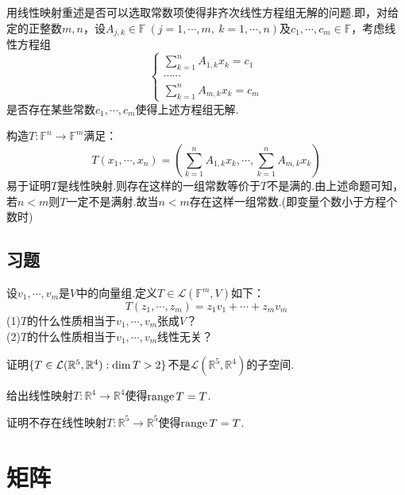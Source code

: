 \documentclass[lang=cn, zihao=5]{elegantbook}
\newcommand{\ssb}[1]{\left( #1 \right)}
\newcommand{\R}{\mathbb{R}}
\newcommand{\F}{\mathbb{F}}
\newcommand{\lmap}{\mathcal{L}}
\DeclareMathOperator{\rge}{range}
\begin{document}
\begin{example}
	用线性映射重述是否可以选取常数项使得非齐次线性方程组无解的问题.即，对给定的正整数$m,n$，设$A_{j,k} \in \F ~(j=1,\cdots ,m,~k=1,\cdots ,n)$及$c_1, \cdots ,c_m \in \F$，考虑线性方程组$$\begin{cases}
		\sum_{k=1}^{n} A_{1,k}x_k = c_1 \\
		\cdots \cdots \\
		\sum_{k=1}^{n} A_{m,k}x_k = c_m
	\end{cases}$$
	是否存在某些常数$c_1, \cdots ,c_m$使得上述方程组无解.
\end{example}
\begin{solution}
	构造$T:\F ^n \to \F ^m$满足：$$T(x_1, \cdots ,x_n) = \ssb{\sum_{k=1}^{n} A_{1,k}x_k, \cdots , \sum_{k=1}^{n} A_{m,k}x_k}$$
	易于证明$T$是线性映射.则存在这样的一组常数等价于$T$不是满的.由上述命题可知，若$n<m$则$T$一定不是满射.故当$n < m$存在这样一组常数.(即变量个数小于方程个数时)
\end{solution}

\subsection*{习题}

\begin{exercise}
	设$v_1,\cdots ,v_m$是$V$中的向量组.定义$T \in \lmap (\F ^m,V)$如下：$$T(z_1, \cdots ,z_m) = z_1v_1 + \cdots + z_mv_m$$
	(1)$T$的什么性质相当于$v_1, \cdots ,v_m$张成$V$？ \\
	(2)$T$的什么性质相当于$v_1, \cdots ,v_m$线性无关？
\end{exercise}

\begin{exercise}
	证明$\{ T \in \lmap (\R ^5,\R ^4):\dim \null T>2 \}$不是$\lmap (\R ^5,\R ^4)$的子空间.
\end{exercise}

\begin{exercise}
	给出线性映射$T : \R ^4 \to \R ^4$使得$\rge T = \null T$.
\end{exercise}

\begin{exercise}
	证明不存在线性映射$T:\R ^5 \to \R ^5$使得$\rge T = \null T$.
\end{exercise}

\begin{exercise}
	
\end{exercise}

\section{矩阵}
\end{document}
